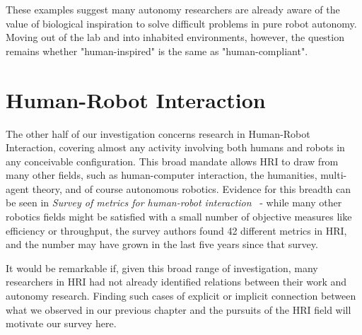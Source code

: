\documentclass{sfuthesis}
\begin{document}
These examples suggest many autonomy researchers are already aware of the value of biological inspiration to solve difficult problems in pure robot autonomy. Moving out of the lab and into inhabited environments, however, the question remains whether "human-inspired" is the same as "human-compliant".



















\chapter{Human-Robot Interaction}

The other half of our investigation concerns research in Human-Robot Interaction, covering almost any activity involving both humans and robots in any conceivable configuration. This broad mandate allows HRI to draw from many other fields, such as human-computer interaction, the humanities, multi-agent theory, and of course autonomous robotics. Evidence for this breadth can be seen in \textit{Survey of metrics for human-robot interaction}~\cite{murphy2013survey} - while many other robotics fields might be satisfied with a small number of objective measures like efficiency or throughput, the survey authors found 42 different metrics in HRI, and the number may have grown in the last five years since that survey.

It would be remarkable if, given this broad range of investigation, many researchers in HRI had not already identified relations between their work and autonomy research. Finding such cases of explicit or implicit connection between what we observed in our previous chapter and the pursuits of the HRI field will motivate our survey here.
\end{document}
